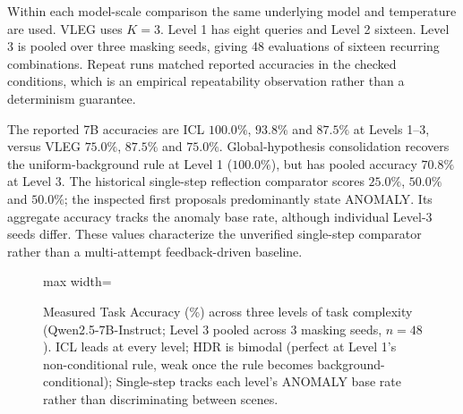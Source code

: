 \documentclass[journal]{IEEEtran}
\theoremstyle{definition}
\theoremstyle{remark}
\begin{document}
Within each model-scale comparison the same underlying model and temperature are used. VLEG uses $K=3$. Level 1 has eight queries and Level 2 sixteen. Level 3 is pooled over three masking seeds, giving 48 evaluations of sixteen recurring combinations. Repeat runs matched reported accuracies in the checked conditions, which is an empirical repeatability observation rather than a determinism guarantee.

The reported 7B accuracies are ICL $100.0\%$, $93.8\%$ and $87.5\%$ at Levels 1--3, versus VLEG $75.0\%$, $87.5\%$ and $75.0\%$. Global-hypothesis consolidation recovers the uniform-background rule at Level 1 ($100.0\%$), but has pooled accuracy $70.8\%$ at Level 3. The historical single-step reflection comparator scores $25.0\%$, $50.0\%$ and $50.0\%$; the inspected first proposals predominantly state ANOMALY. Its aggregate accuracy tracks the anomaly base rate, although individual Level-3 seeds differ. These values characterize the unverified single-step comparator rather than a multi-attempt feedback-driven baseline.

\begin{figure}[!t]
    \centering
    \begin{adjustbox}{max width=\linewidth}\end{adjustbox}
    \caption{Measured Task Accuracy (\%) across three levels of task complexity (Qwen2.5-7B-Instruct; Level 3 pooled across 3 masking seeds, $n=48$). ICL leads at every level; HDR is bimodal (perfect at Level 1's non-conditional rule, weak once the rule becomes background-conditional); Single-step tracks each level's ANOMALY base rate rather than discriminating between scenes.}
    \label{fig:exp1_results}
\end{figure}
\end{document}

